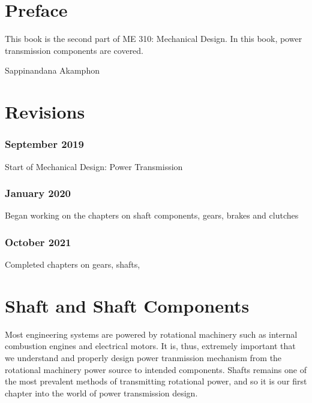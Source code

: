 \documentclass[a4paper,openany]{tufte-book}
\begin{document}
\restoregeometry
\nopagecolor

\frontmatter

\chapter{Preface}
\label{sec:org371e5f5}
This book is the second part of ME 310: Mechanical Design. In this book,
power transmission components are covered.

Sappinandana Akamphon

\tableofcontents

\listoffigures

\listoftables

\chapter{Revisions}
\label{sec:org577f19f}
\subsection{September 2019}
\label{sec:org08ad364}

Start of Mechanical Design: Power Transmission

\subsection{January 2020}
\label{sec:orgb6ba438}

Began working on the chapters on shaft components, gears, brakes and clutches

\subsection{October 2021}
\label{sec:org0214d7c}

Completed chapters on gears, shafts,

\mainmatter

\chapter{Shaft and Shaft Components}
\label{sec:org40573af}

Most engineering systems are powered by rotational machinery such as internal combustion engines and electrical motors. It is, thus, extremely important that we understand and properly design power tranmission mechanism from the rotational machinery power source to intended components. Shafts remains one of the most prevalent methods of transmitting rotational power, and so it is our first chapter into the world of power transmission design.
\end{document}
